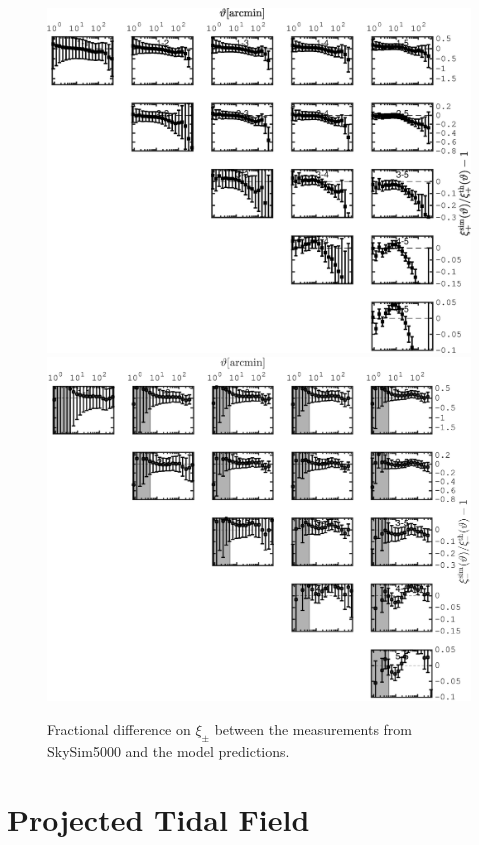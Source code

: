 \appendix

\begin{figure}
\includegraphics[width=\columnwidth]{graphs/xip_sims_vs_th.eps}
\includegraphics[width=\columnwidth]{graphs/xim_sims_vs_th.eps}
\caption{Fractional difference on $\xi_\pm$ between the measurements from SkySim5000 and the model predictions.  }
\label{fig:frac_err_sims_th}
\end{figure}

\section{Projected Tidal Field}
\label{app:2d_TT}


